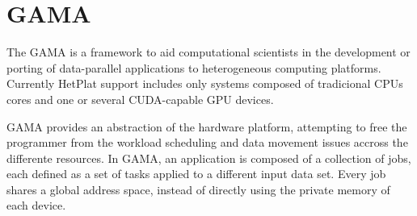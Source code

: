 \documentclass[main.tex]{subfiles}
\begin{document}
\chapter{GAMA}

The \acf{GAMA} is a framework to aid computational scientists in the development or porting of data-parallel applications to heterogeneous computing platforms. Currently \ac{HetPlat} support includes only systems composed of tradicional \acp{CPU} cores and one or several CUDA-capable \ac{GPU} devices.

\ac{GAMA} provides an abstraction of the hardware platform, attempting to free the programmer from the workload scheduling and data movement issues accross the differente resources. In \ac{GAMA}, an application is composed of a collection of jobs, each defined as a set of tasks applied to a different input data set. Every job shares a global address space, instead of directly using the private memory of each device.
\end{document}
